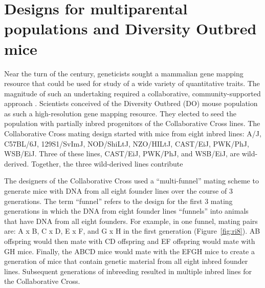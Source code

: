 \documentclass[oneside]{book}\usepackage[]{graphicx}\usepackage[]{color}
\begin{document}
\section{Designs for multiparental populations and Diversity Outbred mice}\label{sec:mpp-designs}

Near the turn of the century, geneticists sought a mammalian gene mapping resource 
that could be used for study of a wide variety of quantitative traits. 
The magnitude of such an undertaking required a collaborative, community-supported
approach \citep{de2014genetics}. Scientists conceived of the Diversity Outbred (DO)
mouse population as such a high-resolution gene mapping resource.
They elected to seed the population with partially inbred progenitors of the
Collaborative Cross lines. The Collaborative Cross mating design started with
mice from eight inbred lines: A/J, C57BL/6J, 129S1/SvImJ,
NOD/ShiLtJ, NZO/HILtJ, CAST/EiJ, PWK/PhJ, WSB/EiJ. Three of these lines, CAST/EiJ, PWK/PhJ, and WSB/EiJ, are wild-derived. Together, the three wild-derived lines contribute 

The designers of the Collaborative Cross used a ``multi-funnel'' mating scheme to generate
mice with DNA from all eight founder lines over the course of 3 generations.
The term ``funnel'' refers to the design for the first 3 mating generations in which the
DNA from eight founder lines ``funnels'' into animals that have DNA from all eight founders.
For example, in one funnel, mating pairs are: A x B, C x D, E x F, and G x H in the first generation (Figure~\ref{fig:ri8}).
AB offspring would then mate with CD offspring and EF offspring would mate with GH mice.
Finally, the ABCD mice would mate with the EFGH mice to create a generation of mice that
contain genetic material from all eight inbred founder lines.
Subsequent generations of inbreeding resulted in multiple inbred lines for the Collaborative Cross.
\end{document}
